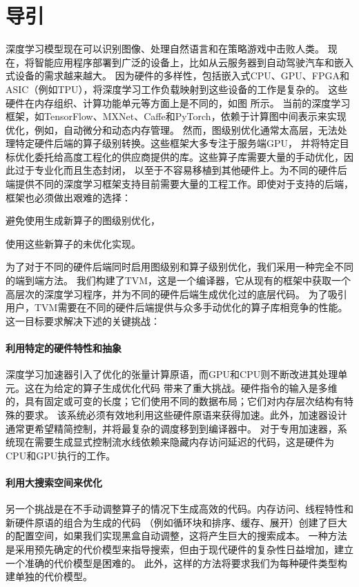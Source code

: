 \section{导引}
深度学习模型现在可以识别图像、处理自然语言和在策略游戏中击败人类。
现在，将智能应用程序部署到广泛的设备上，比如从云服务器到自动驾驶汽车和嵌入式设备的需求越来越大。
因为硬件的多样性，包括嵌入式CPU、GPU、FPGA和ASIC（例如TPU），将深度学习工作负载映射到这些设备的工作是复杂的。
这些硬件在内存组织、计算功能单元等方面上是不同的，如图  所示。
当前的深度学习框架，如TensorFlow、MXNet、Caffe和PyTorch，依赖于计算图中间表示来实现优化，例如，自动微分和动态内存管理。
然而，图级别优化通常太高层，无法处理特定硬件后端的算子级别转换。这些框架大多专注于服务端GPU，
并将特定目标优化委托给高度工程化的供应商提供的库。这些算子库需要大量的手动优化，因此过于专业化而且生态封闭，
以至于不容易移植到其他硬件上。为不同的硬件后端提供不同的深度学习框架支持目前需要大量的工程工作。即使对于支持的后端，
框架也必须做出艰难的选择：
\begin{enumerate*}
    \item 避免使用生成新算子的图级别优化，
    \item 使用这些新算子的未优化实现。
\end{enumerate*}

为了对于不同的硬件后端同时启用图级别和算子级别优化，我们采用一种完全不同的端到端方法。
我们构建了TVM，这是一个编译器，它从现有的框架中获取一个高层次的深度学习程序，并为不同的硬件后端生成优化过的底层代码。
为了吸引用户，TVM需要在不同的硬件后端提供与众多手动优化的算子库相竞争的性能。这一目标要求解决下述的关键挑战：

\paragraph{利用特定的硬件特性和抽象}
深度学习加速器引入了优化的张量计算原语，而GPU和CPU则不断改进其处理单元。这在为给定的算子生成优化代码
带来了重大挑战。硬件指令的输入是多维的，具有固定或可变的长度；它们使用不同的数据布局；它们对内存层次结构有特殊的要求。
该系统必须有效地利用这些硬件原语来获得加速。此外，加速器设计通常更希望精简控制，并将最复杂的调度移到到编译器中。
对于专用加速器，系统现在需要生成显式控制流水线依赖来隐藏内存访问延迟的代码，这是硬件为CPU和GPU执行的工作。

\paragraph{利用大搜索空间来优化}
另一个挑战是在不手动调整算子的情况下生成高效的代码。内存访问、线程特性和新硬件原语的组合为生成的代码
（例如循环块和排序、缓存、展开）创建了巨大的配置空间，如果我们实现黑盒自动调整，这将产生巨大的搜索成本。
一种方法是采用预先确定的代价模型来指导搜索，但由于现代硬件的复杂性日益增加，建立一个准确的代价模型是困难的。
此外，这样的方法将要求我们为每种硬件类型构建单独的代价模型。

